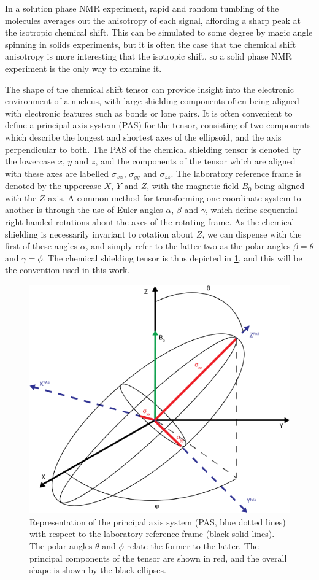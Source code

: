 \begin{refsection}
In a solution phase NMR experiment, rapid and random tumbling of the molecules averages out the anisotropy of each signal, affording a sharp peak at the isotropic chemical shift.
This can be simulated to some degree by magic angle spinning in solids experiments, but it is often the case that the chemical shift anisotropy is more interesting that the isotropic shift, so a solid phase NMR experiment is the only way to examine it.

The shape of the chemical shift tensor can provide insight into the electronic environment of a nucleus, with large shielding components often being aligned with electronic features such as bonds or lone pairs.
It is often convenient to define a principal axis system (PAS) for the tensor, consisting of two components which describe the longest and shortest axes of the ellipsoid, and the axis perpendicular to both.
The PAS of the chemical shielding tensor is denoted by the lowercase $x$, $y$ and $z$, and the components of the tensor which are aligned with these axes are labelled $\sigma_{xx}$, $\sigma_{yy}$ and $\sigma_{zz}$.
The laboratory reference frame is denoted by the uppercase $X$, $Y$ and $Z$, with the magnetic field $B_0$ being aligned with the $Z$ axis.
A common method for transforming one coordinate system to another is through the use of Euler angles $\alpha$, $\beta$ and $\gamma$, which define sequential right-handed rotations about the axes of the rotating frame.
As the chemical shielding is necessarily invariant to rotation about $Z$, we can dispense with the first of these angles $\alpha$, and simply refer to the latter two as the polar angles $\beta = \theta$ and $\gamma = \phi$.
The chemical shielding tensor is thus depicted in \cref{fig:chemical-shielding-tensor}, and this will be the convention used in this work.

\begin{figure}
  \centering
  \includegraphics[width=0.4\linewidth]{Figures/Chemical_Shift_Tensor.png}
  \caption{Representation of the principal axis system (PAS, blue dotted lines) with respect to the laboratory reference frame (black solid lines). The polar angles $\theta$ and $\phi$ relate the former to the latter. The principal components of the tensor are shown in red, and the overall shape is shown by the black ellipses.}
  \label{fig:chemical-shielding-tensor}
\end{figure}


\end{refsection}
